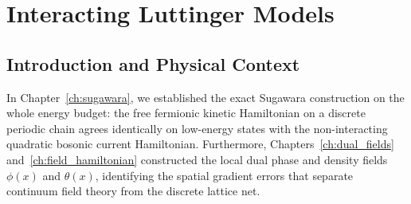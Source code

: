 \chapter{Interacting Luttinger Models}
\label{ch:luttinger_models}

\section{Introduction and Physical Context}

In Chapter~\ref{ch:sugawara}, we established the exact Sugawara construction on the whole energy budget: the free fermionic kinetic Hamiltonian on a discrete periodic chain agrees identically on low-energy states with the non-interacting quadratic bosonic current Hamiltonian. Furthermore, Chapters~\ref{ch:dual_fields} and~\ref{ch:field_hamiltonian} constructed the local dual phase and density fields $\phi(x)$ and $\theta(x)$, identifying the spatial gradient errors that separate continuum field theory from the discrete lattice net.

